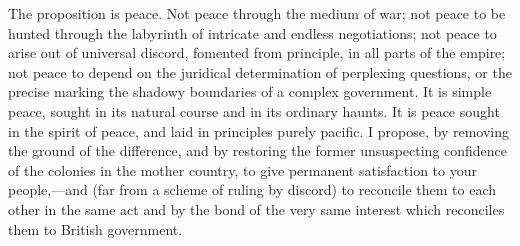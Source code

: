 The proposition is peace. Not peace through the medium of war; not peace to be hunted through the labyrinth of intricate and endless negotiations; not peace to arise out of universal discord, fomented from principle, in all parts of the empire; not peace to depend on the juridical determination of perplexing questions, or the precise marking the shadowy boundaries of a complex government. It is simple peace, sought in its natural course and in its ordinary haunts. It is peace sought in the spirit of peace, and laid in principles purely pacific. I propose, by removing the ground of the difference, and by restoring the former unsuspecting confidence of the colonies in the mother country, to give permanent satisfaction to your people,—and (far from a scheme of ruling by discord) to reconcile them to each other in the same act and by the bond of the very same interest which reconciles them to British government.

